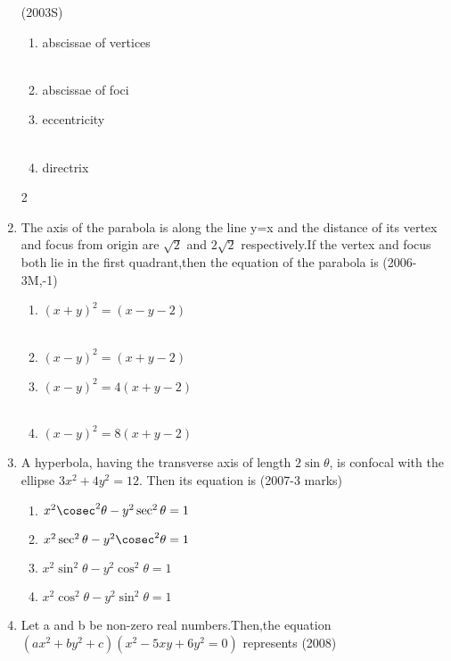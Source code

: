 \begin{enumerate}
\hfill{(2003S)}
\begin{multicols}{2}
\begin{enumerate}
    \item abscissae of vertices\\\\
    \item abscissae of foci
    \item eccentricity\\\\
    \item directrix
\end{enumerate}
\end{multicols}{2}
\item The axis of the parabola is along the line y=x and the distance of its vertex and focus from  origin are $\sqrt2$ and $2\sqrt2$  respectively.If the vertex and focus both lie in the first quadrant,then the equation of the parabola is \hfill{(2006-3M,-1)}
\begin{multicols}{2}
\begin{enumerate}
    \item $(x+y)^{2}=(x-y-2)$\\\\
    \item $(x-y)^{2}=(x+y-2)$
    \item $(x-y)^{2}=4(x+y-2)$\\\\
    \item $(x-y)^{2}=8(x+y-2)$
\end{enumerate}
\end{multicols}
\item A hyperbola, having the transverse axis of length $2\sin\theta$, is confocal with the ellipse $3x^{2}+4y^{2}=12$. Then its equation is \hfill{(2007-3 marks)}
\begin{enumerate}
    \item ${x^{2}\cosec^{2}\theta}-{y^{2}\sec^{2}\theta=1}$\\
    \item $x^{2}\sec^{2}\theta-y^{2}\cosec^{2}\theta=1$\\
    \item $x^{2}\sin^{2}\theta-y^{2}\cos^{2}\theta=1$\\
    \item $x^{2}\cos^{2}\theta-y^{2}\sin^{2}\theta=1$\\
\end{enumerate}
\item Let a and b be non-zero real numbers.Then,the equation $(ax^{2}+by^{2}+c)(x^{2}-5xy+6y^{2}=0)$ represents \hfill{(2008)}

\end{enumerate}
